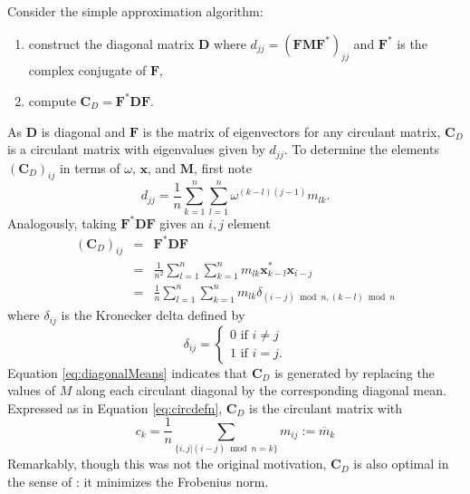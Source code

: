 \documentclass[letterpaper,12pt,oneside,final]{article}
\newcommand{\ve}[1]{\mathbf{#1}}           %
\newcommand{\m}[1]{\mathbf{#1}}               %
\newcommand{\conj}[1]{{#1}^{\ast}}
\newcommand{\widebar}[1]{\overline{#1}}
\begin{document}
Consider the simple approximation algorithm:
\begin{enumerate}
\item construct the diagonal matrix $\m{D}$ where $d_{jj} = (\m{F} \m{M} \conj{\m{F}})_{jj}$ and $\conj{\m{F}}$ is the complex conjugate of $\m{F}$,
\item compute $\m{C}_{D} = \conj{\m{F}} \m{D} \m{F}$.
\end{enumerate}
As $\m{D}$ is diagonal and $\m{F}$ is the matrix of eigenvectors for any circulant matrix, $\m{C}_{D}$ is a circulant matrix with eigenvalues given by $d_{jj}$. To determine the elements $(\m{C}_{D})_{ij}$ in terms of $\omega$, $\ve{x}$, and $\m{M}$, first note
\begin{equation} \label{eq:Dexplicit}
  d_{jj} = \frac{1}{n} \sum_{k = 1}^n \sum_{l = 1}^n \omega^{(k - l)(j - 1)} m_{lk}.
\end{equation}
Analogously, taking $\conj{\m{F}} \m{D} \m{F}$ gives an $i,j$ element
\begin{eqnarray}
  (\m{C}_D)_{ij} & = & \conj{\m{F}} \m{D} \m{F} \nonumber \\
                 & = & \frac{1}{n^2} \sum_{l = 1}^n \sum_{k = 1}^n m_{lk} \conj{\ve{x}}_{k-l} \ve{x}_{i - j} \nonumber \\
                 & = & \frac{1}{n}  \sum_{l = 1}^n \sum_{k = 1}^n m_{lk} \delta_{(i - j)\bmod n, (k - l)\bmod n} \label{eq:diagonalMeans}
\end{eqnarray}
where $\delta_{ij}$ is the Kronecker delta defined by
\begin{equation}
  \delta_{ij} = \begin{cases} 0 \text{ if } i \neq j \\ 1 \text{ if } i = j. \end{cases}
\end{equation}
Equation \ref{eq:diagonalMeans} indicates that $\m{C}_D$ is generated by replacing the values of $M$ along each circulant diagonal by the corresponding diagonal mean. Expressed as in Equation \ref{eq:circdefn}, $\m{C}_D$ is the circulant matrix with
\begin{equation} \label{eq:circDiagonalMeans}
  c_{k} = \frac{1}{n} \sum_{\{i,j| (i-j) \bmod n = k \}} m_{ij} := \widebar{m}_k
\end{equation}
Remarkably, though this was not the original motivation, $\m{C}_{D}$ is also optimal in the sense of \cite{chan1988optimal}: it minimizes the Frobenius norm.
\end{document}
